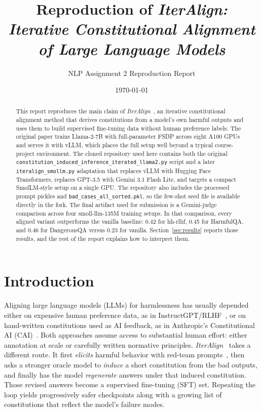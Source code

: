 \documentclass[11pt]{article}
\title{Reproduction of \textit{IterAlign: Iterative Constitutional Alignment of Large Language Models}}
\author{NLP Assignment 2 Reproduction Report}
\date{\today}
\begin{document}
\maketitle

\begin{abstract}
This report reproduces the main claim of \textit{IterAlign}~\cite{chen2024iteralign}, an iterative constitutional alignment method that derives constitutions from a model's own harmful outputs and uses them to build supervised fine-tuning data without human preference labels. The original paper trains Llama-2-7B with full-parameter FSDP across eight A100 GPUs and serves it with vLLM, which places the full setup well beyond a typical course-project environment. The cloned repository used here contains both the original \texttt{constitution\_induced\_inference\_iterated\_llama2.py} script and a later \texttt{iteralign\_smollm.py} adaptation that replaces vLLM with Hugging Face Transformers, replaces GPT-3.5 with Gemini 3.1 Flash Lite, and targets a compact SmolLM-style setup on a single GPU. The repository also includes the processed prompt pickles and \texttt{bad\_cases\_all\_sorted.pkl}, so the few-shot seed file is available directly in the fork. The final artifact used for submission is a Gemini-judge comparison across four smoll-llm-135M training setups. In that comparison, every aligned variant outperforms the vanilla baseline: 0.42 for hh-rlhf, 0.45 for HarmfulQA, and 0.46 for DangerousQA versus 0.23 for vanilla. Section~\ref{sec:results} reports those results, and the rest of the report explains how to interpret them.
\end{abstract}

\section{Introduction}
\label{sec:intro}

Aligning large language models (LLMs) for harmlessness has usually depended either on expensive human preference data, as in InstructGPT/RLHF~\cite{ouyang2022instructgpt}, or on hand-written constitutions used as AI feedback, as in Anthropic's Constitutional AI (CAI)~\cite{bai2022cai}. Both approaches assume access to substantial human effort: either annotation at scale or carefully written normative principles. \textit{IterAlign}~\cite{chen2024iteralign} takes a different route. It first \emph{elicits} harmful behavior with red-team prompts~\cite{ganguli2022redteam}, then asks a stronger oracle model to \emph{induce} a short constitution from the bad outputs, and finally has the model \emph{regenerate} answers under that induced constitution. Those revised answers become a supervised fine-tuning (SFT) set. Repeating the loop yields progressively safer checkpoints along with a growing list of constitutions that reflect the model's failure modes.
\end{document}
